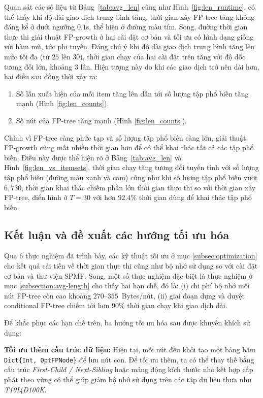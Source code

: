 \documentclass[conference]{IEEEtran}
\begin{document}
Quan sát các số liệu từ Bảng~\ref{tab:avg_len} cũng như Hình~\ref{fig:len_runtime}, có thể thấy khi độ dài giao dịch trung bình tăng, thời gian xây FP-tree tăng không đáng kể ở dưới ngưỡng $0.1$s, thể hiện ở đường màu tím. Song, đường thời gian thực thi giải thuật FP-growth ở hai cài đặt cơ bản và tối ưu có hình dạng giống với hàm mũ, tức phi tuyến. Đáng chú ý khi độ dài giao dịch trung bình tăng lên mức tối đa (từ $25$ lên $30$), thời gian chạy của hai cài đặt trên tăng với độ dốc tương đối lớn, khoảng $3$ lần. Hiện tượng này do khi các giao dịch trở nên dài hơn, hai điều sau đồng thời xảy ra:

\begin{enumerate}
    \item Số lần xuất hiện của mỗi item tăng lên dẫn tới số lượng tập phổ biến tăng mạnh (Hình \ref{fig:len_counts}).
    \item Số nút của FP-tree tăng mạnh (Hình \ref{fig:len_counts}).
\end{enumerate}

Chính vì FP-tree càng phức tạp và số lượng tập phổ biến càng lớn, giải thuật FP-growth cũng mất nhiều thời gian hơn để có thể khai thác tất cả các tập phổ biến. Điều này được thể hiện rõ ở Bảng~\ref{tab:avg_len} và Hình~\ref{fig:len_vs_itemsets}, thời gian chạy tăng tương đối tuyến tính với số lượng tập phổ biến (đường màu xanh và cam) cũng như khi số lượng tập phổ biến vượt $6,730$, thời gian khai thác chiếm phần lớn thời gian thực thi so với thời gian xây FP-tree, điển hình ở $T=30$ với hơn $92.4\%$ thời gian dùng để khai thác tập phổ biến.

\subsection{Kết luận và đề xuất các hướng tối ưu hóa}
Qua $6$ thực nghiệm đã trình bày, các kỹ thuật tối ưu ở mục \ref{subsec:optimization} cho kết quả cải tiến về thời gian thực thi cũng như bộ nhớ sử dụng so với cài đặt cơ bản và thư viện SPMF. Song, một số thực nghiệm đặc biệt là thực nghiệm ở mục \ref{subsection:avg-length} cho thấy hai hạn chế, đó là: (i) chi phí bộ nhớ mỗi nút FP-tree còn cao khoảng $270$--$355$~Bytes/nút, (ii) giai đoạn dựng và duyệt conditional FP-tree chiếm tới hơn $90\%$ thời gian chạy khi giao dịch dài.

Để khắc phục các hạn chế trên, ba hướng tối ưu hóa sau được khuyến khích sử dụng:

\textbf{Tối ưu thêm cấu trúc dữ liệu:}
Hiện tại, mỗi nút đều khởi tạo một bảng băm \texttt{Dict\{Int, OptFPNode\}} để lưu nút con. Để tối ưu thêm, ta có thể thay thế bằng cấu trúc \textit{First-Child / Next-Sibling} hoặc mảng động kích thước nhỏ kết hợp cấp phát theo vùng có thể giúp giảm bộ nhớ sử dụng trên các tập dữ liệu thưa như \textit{T10I4D100K}.
\end{document}
